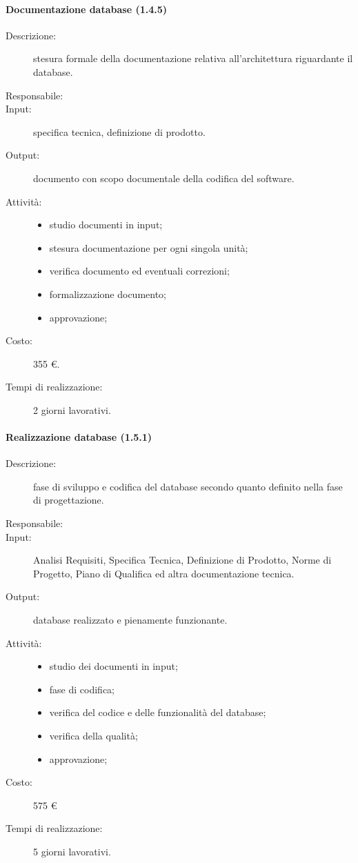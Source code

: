 \paragraph{Documentazione database (1.4.5)}
\begin{description}
\item[Descrizione:] stesura formale della documentazione relativa all'architettura riguardante il database.
\item[Responsabile:] 
\item[Input:] specifica tecnica, definizione di prodotto.
\item[Output:] documento con scopo documentale della codifica del software.
\item[Attivit\`{a}:] 
\begin{center}
\begin{itemize}
\item studio documenti in input;
\item stesura documentazione per ogni singola unit\`{a};
\item verifica documento ed eventuali correzioni;
\item formalizzazione documento;
\item approvazione;
\end{itemize}
\end{center}
\item[Costo:] 355 \euro{}.
\item[Tempi di realizzazione:] 2 giorni lavorativi.
\end{description}

\paragraph{Realizzazione database (1.5.1)}
\begin{description}
\item[Descrizione:] fase di sviluppo e codifica del database secondo quanto definito nella fase di progettazione.
\item[Responsabile:] 
\item[Input:] Analisi Requisiti, Specifica Tecnica, Definizione di Prodotto, Norme di Progetto, Piano di Qualifica ed altra documentazione tecnica.
\item[Output:]database realizzato e pienamente funzionante.
\item[Attivit\`{a}:] 
\begin{center}
\begin{itemize}
\item studio dei documenti in input;
\item fase di codifica;
\item verifica del codice e delle funzionalit\`{a} del database;
\item verifica della qualit\`{a};
\item approvazione;
\end{itemize}
\end{center}
\item[Costo:] 575 \euro{}
\item[Tempi di realizzazione:] 5 giorni lavorativi.
\end{description}

